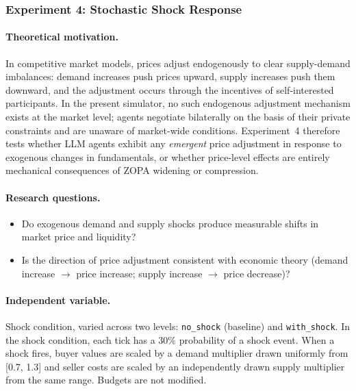\subsubsection{Experiment 4: Stochastic Shock Response}
\label{sec:exp-shock}

\paragraph{Theoretical motivation.}
In competitive market models, prices adjust endogenously to clear supply-demand imbalances: demand increases push prices upward, supply increases push them downward, and the adjustment occurs through the incentives of self-interested participants.  In the present simulator, no such endogenous adjustment mechanism exists at the market level; agents negotiate bilaterally on the basis of their private constraints and are unaware of market-wide conditions.  Experiment~4 therefore tests whether LLM agents exhibit any \emph{emergent} price adjustment in response to exogenous changes in fundamentals, or whether price-level effects are entirely mechanical consequences of ZOPA widening or compression.

\paragraph{Research questions.}
\begin{itemize}
    \item[\textbf{RQ-41.}] Do exogenous demand and supply shocks produce measurable shifts in market price and liquidity?
    \item[\textbf{RQ-42.}] Is the direction of price adjustment consistent with economic theory (demand increase $\to$ price increase; supply increase $\to$ price decrease)?
\end{itemize}

\paragraph{Independent variable.}
Shock condition, varied across two levels: \texttt{no\_shock} (baseline) and \texttt{with\_shock}.  In the shock condition, each tick has a 30\% probability of a shock event.  When a shock fires, buyer values are scaled by a demand multiplier drawn uniformly from [0.7, 1.3] and seller costs are scaled by an independently drawn supply multiplier from the same range.  Budgets are not modified.

